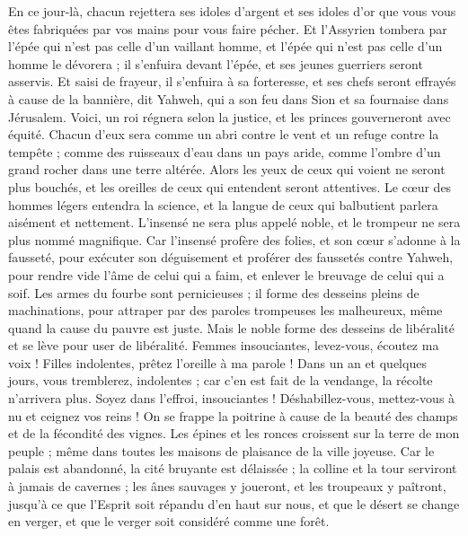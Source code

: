 \begin{multicols}{2}
En ce jour-là, chacun rejettera ses idoles d'argent et ses idoles d'or que vous vous êtes fabriquées par vos mains pour vous faire pécher.
Et l'Assyrien tombera par l'épée qui n'est pas celle d'un vaillant homme, et l'épée qui n'est pas celle d'un homme le dévorera ; il s'enfuira devant l'épée, et ses jeunes guerriers seront asservis.
Et saisi de frayeur, il s'enfuira à sa forteresse, et ses chefs seront effrayés à cause de la bannière, dit Yahweh, qui a son feu dans Sion et sa fournaise dans Jérusalem.
\VerseOne{}Voici, un roi régnera selon la justice, et les princes gouverneront avec équité.
Chacun d'eux sera comme un abri contre le vent et un refuge contre la tempête ; comme des ruisseaux d'eau dans un pays aride, comme l'ombre d'un grand rocher dans une terre altérée.
Alors les yeux de ceux qui voient ne seront plus bouchés, et les oreilles de ceux qui entendent seront attentives.
Le cœur des hommes légers entendra la science, et la langue de ceux qui balbutient parlera aisément et nettement.
L'insensé ne sera plus appelé noble, et le trompeur ne sera plus nommé magnifique.
Car l'insensé profère des folies, et son cœur s'adonne à la fausseté, pour exécuter son déguisement et proférer des faussetés contre Yahweh, pour rendre vide l'âme de celui qui a faim, et enlever le breuvage de celui qui a soif.
Les armes du fourbe sont pernicieuses ; il forme des desseins pleins de machinations, pour attraper par des paroles trompeuses les malheureux, même quand la cause du pauvre est juste.
Mais le noble forme des desseins de libéralité et se lève pour user de libéralité.
Femmes insouciantes, levez-vous, écoutez ma voix ! Filles indolentes, prêtez l'oreille à ma parole !
Dans un an et quelques jours, vous tremblerez, indolentes ; car c'en est fait de la vendange, la récolte n'arrivera plus.
Soyez dans l'effroi, insouciantes ! Déshabillez-vous, mettez-vous à nu et ceignez vos reins !
On se frappe la poitrine à cause de la beauté des champs et de la fécondité des vignes.
Les épines et les ronces croissent sur la terre de mon peuple ; même dans toutes les maisons de plaisance de la ville joyeuse.
Car le palais est abandonné, la cité bruyante est délaissée ; la colline et la tour serviront à jamais de cavernes ; les ânes sauvages y joueront, et les troupeaux y paîtront,
jusqu'à ce que l'Esprit soit répandu d'en haut sur nous, et que le désert se change en verger, et que le verger soit considéré comme une forêt.

\end{multicols}
